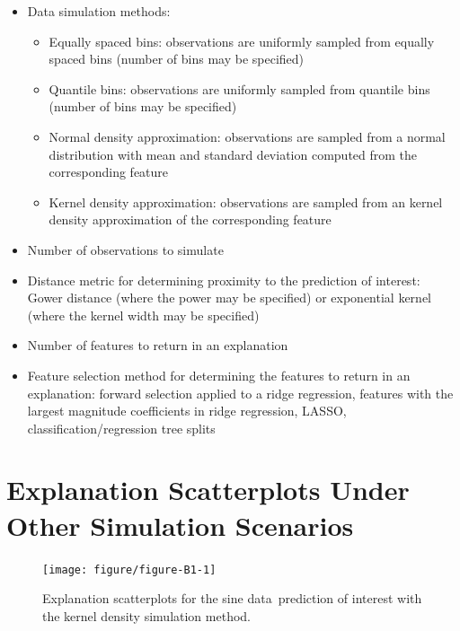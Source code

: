 \documentclass[AMS,STIX2COL]{WileyNJD-v2}\usepackage[]{graphicx}\usepackage[]{color}
\newenvironment{knitrout}{}{} %
\newcommand{\data}{sine data}
\begin{document}
\begin{itemize}

\item Data simulation methods:

\begin{itemize}
\item Equally spaced bins: observations are uniformly sampled from equally spaced bins (number of bins may be specified)
\item Quantile bins: observations are uniformly sampled from quantile bins (number of bins may be specified)
\item Normal density approximation: observations are sampled from a normal distribution with mean and standard deviation computed from the corresponding feature
\item Kernel density approximation: observations are sampled from an kernel density approximation of the corresponding feature
\end{itemize}

\item Number of observations to simulate

\item Distance metric for determining proximity to the prediction of interest: Gower distance (where the power may be specified) or exponential kernel (where the kernel width may be specified)

\item Number of features to return in an explanation

\item Feature selection method for determining the features to return in an explanation: forward selection applied to a ridge regression, features with the largest magnitude coefficients in ridge regression, LASSO, classification/regression tree splits

\end{itemize}

\section{Explanation Scatterplots Under Other Simulation Scenarios} \label{exp-scatter_plus}

\begin{figure}[!thp]
\begin{knitrout}
\color{fgcolor}

{\centering \texttt{[image: figure/figure-B1-1]} 

}



\end{knitrout}
\caption{Explanation scatterplots for the \data \ prediction of interest with the kernel density simulation method.}
\label{fig:figure-B1}
\end{figure}
\end{document}
